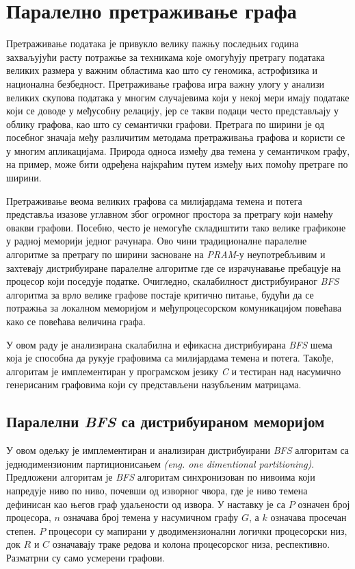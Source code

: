 \chapter{Паралелно претраживање графа}
Претраживање података је привукло велику пажњу последњих година захваљујући расту потражње за техникама које омогућују претрагу података великих размера у важним областима као што су геномика, астрофизика и национална безбедност. Претраживање графова игра важну улогу у анализи великих скупова података у многим случајевима који у некој мери имају податаке који се доводе у међусобну релацију, јер се такви подаци често представљају у облику графова, као што су семантички графови. Претрага по ширини је од посебног значаја међу различитим методама претраживања графова и користи се у многим апликацијама. Природа односа између два темена у семантичком графу, на пример, може бити одређена најкраћим путем између њих помоћу претраге по ширини.

\par
Претраживање веома великих графова са милијардама темена и потега представља изазове углавном због огромног простора за претрагу који намећу овакви графови. Посебно, често је немогуће складиштити тако велике графиконе у радној меморији једног рачунара. Ово чини традиционалне паралелне алгоритме за претрагу по ширини засноване на \textit{PRAM}-у неупотребљивим и захтевају дистрибуиране паралелне алгоритме где се израчунавање
пребацује на процесор који поседује податке. Очигледно, скалабилност дистрибуираног \textit{BFS} алгоритма за врло
велике графове постаје критично питање, будући да се потражња за локалном меморијом и међупроцесорском комуникацијом
повећава како се повећава величина графа. 

\par
У овом раду је анализирана скалабилна и ефикасна дистрибуирана \textit{BFS} шема која је способна да рукује графовима са милијардама темена и потега. Такође, алгоритам је имплементиран у програмском језику \textit{C} и тестиран над насумично генерисаним графовима који су представљени назубљеним матрицама.

\section{Паралелни \textit{BFS} са дистрибуираном меморијом}
У овом одељку је имплементиран и анализиран дистрибуирани \textit{BFS} алгоритам са једнодимензионим партиционисањем \textit{(eng. one dimentional partitioning)}. Предложени
алгоритам је \textit{BFS} алгоритам синхронизован по нивоима који напредује ниво по ниво, почевши од изворног чвора, где је ниво темена дефинисан као његов граф удаљености од извора. У наставку је са $P$ означен број процесора, $n$ означава број темена у насумичном графу $G$, а $k$ означава просечан степен. $P$ процесори су мапирани у дводимензионални логички процесорски низ, док $R$ и $C$ означавају траке редова и колона процесорског низа, респективно. Разматрни су само усмерени графови.

